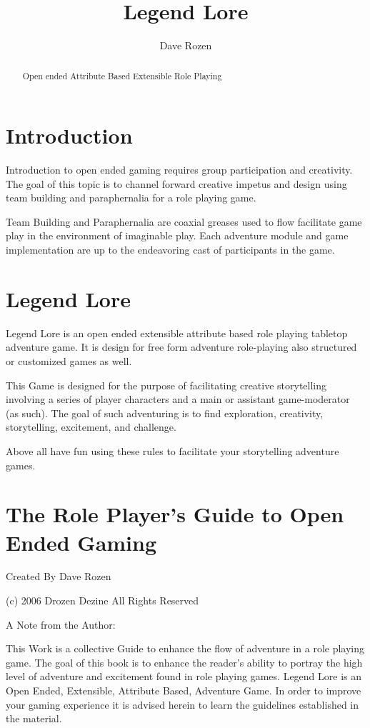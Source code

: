 \documentclass{article}
\author{Dave Rozen}
\title{Legend Lore}
\begin{document}
\begin{abstract}
Open ended Attribute Based Extensible Role Playing
\end{abstract}

\section{Introduction}

Introduction to open ended gaming requires group participation and creativity. The goal of this topic is to  channel forward creative impetus and design using team building and paraphernalia for a  role playing game.

Team Building and Paraphernalia are coaxial greases used to flow facilitate game play in the environment of imaginable play. Each adventure module and game implementation are up to the endeavoring cast of participants in the game.

\section{Legend Lore}

Legend Lore is an open ended extensible attribute based role playing tabletop adventure game. It is design for free form adventure role-playing also structured or customized games as well.

This Game is designed for the purpose of facilitating creative storytelling involving a series of player characters and a main or assistant game-moderator (as such). The goal of such adventuring is to find exploration, creativity, storytelling, excitement, and challenge.

Above all have fun using these rules to facilitate your storytelling adventure games.

\section{The Role Player's Guide to Open Ended Gaming}

Created By Dave Rozen

(c) 2006 Drozen Dezine All Rights Reserved

A Note from the Author:

This Work is a collective Guide to enhance the flow of adventure in a role playing game. The goal of this book is to enhance the reader's ability to portray the high level of adventure and excitement found in role playing games. Legend Lore is an Open Ended, Extensible, Attribute Based, Adventure Game. In order to improve your gaming experience it is advised herein to learn the guidelines established in the material.
\end{document}
